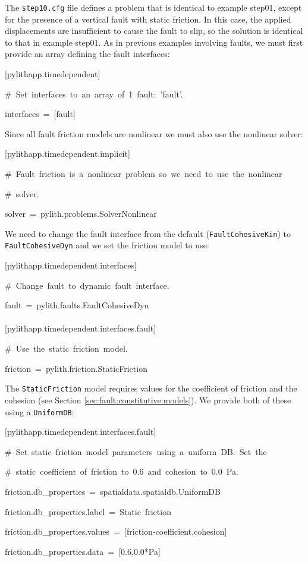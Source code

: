 The \texttt{step10.cfg} file defines a problem that is identical to
example step01, except for the presence of a vertical fault with static
friction. In this case, the applied displacements are insufficient
to cause the fault to slip, so the solution is identical to that in
example step01. As in previous examples involving faults, we must
first provide an array defining the fault interfaces:
\begin{lyxcode}
{[}pylithapp.timedependent{]}

\#~Set~interfaces~to~an~array~of~1~fault:~'fault'.

interfaces~=~{[}fault{]}
\end{lyxcode}
Since all fault friction models are nonlinear we must also use the
nonlinear solver:
\begin{lyxcode}
{[}pylithapp.timedependent.implicit{]}

\#~Fault~friction~is~a~nonlinear~problem~so~we~need~to~use~the~nonlinear

\#~solver.

solver~=~pylith.problems.SolverNonlinear
\end{lyxcode}
We need to change the fault interface from the default (\texttt{FaultCohesiveKin})
to \texttt{FaultCohesiveDyn} and we set the friction model to use:
\begin{lyxcode}
{[}pylithapp.timedependent.interfaces{]}

\#~Change~fault~to~dynamic~fault~interface.

fault~=~pylith.faults.FaultCohesiveDyn~\\
~\\


{[}pylithapp.timedependent.interfaces.fault{]}

\#~Use~the~static~friction~model.

friction~=~pylith.friction.StaticFriction
\end{lyxcode}
The \texttt{StaticFriction} model requires values for the coefficient
of friction and the cohesion (see Section \ref{sec:fault:constitutive:models}).
We provide both of these using a \texttt{UniformDB}:
\begin{lyxcode}
{[}pylithapp.timedependent.interfaces.fault{]}

\#~Set~static~friction~model~parameters~using~a~uniform~DB.~Set~the

\#~static~coefficient~of~friction~to~0.6~and~cohesion~to~0.0~Pa.

friction.db\_properties~=~spatialdata.spatialdb.UniformDB

friction.db\_properties.label~=~Static~friction

friction.db\_properties.values~=~{[}friction-coefficient,cohesion{]}

friction.db\_properties.data~=~{[}0.6,0.0{*}Pa{]}
\end{lyxcode}
